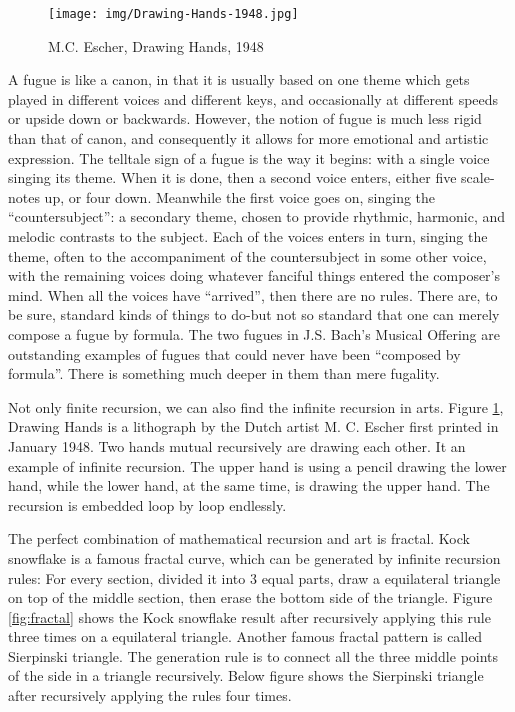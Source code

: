 \documentclass{article}
\begin{document}
\begin{figure}[htbp]
 \centering
 \texttt{[image: img/Drawing-Hands-1948.jpg]}
 \caption{M.C. Escher, Drawing Hands, 1948}
 \label{fig:Drawing-Hands}
\end{figure}

A fugue is like a canon, in that it is usually based on one theme which gets played in different voices and different keys, and occasionally at different speeds or upside down or backwards. However, the notion of fugue is much less rigid than that of canon, and consequently it allows for more emotional and artistic expression. The telltale sign of a fugue is the way it begins: with a single voice singing its theme. When it is done, then a second voice enters, either five scale-notes up, or four down. Meanwhile the first voice goes on, singing the ``countersubject'': a secondary theme, chosen to provide rhythmic, harmonic, and melodic contrasts to the subject. Each of the voices enters in turn, singing the theme, often to the accompaniment of the countersubject in some other voice, with the remaining voices doing whatever fanciful things entered the composer's mind. When all the voices have ``arrived'', then there are no rules. There are, to be sure, standard kinds of things to do-but not so standard that one can merely compose a fugue by formula. The two fugues in J.S. Bach's Musical Offering are outstanding examples of fugues that could never have been ``composed by formula''. There is something much deeper in them than mere fugality\cite{GEB}.

Not only finite recursion, we can also find the infinite recursion in arts. Figure \ref{fig:Drawing-Hands}, Drawing Hands is a lithograph by the Dutch artist M. C. Escher first printed in January 1948. Two hands mutual recursively are drawing each other. It an example of infinite recursion. The upper hand is using a pencil drawing the lower hand, while the lower hand, at the same time, is drawing the upper hand. The recursion is embedded loop by loop endlessly.

The perfect combination of mathematical recursion and art is fractal. Kock snowflake is a famous fractal curve, which can be generated by infinite recursion rules: For every section, divided it into 3 equal parts, draw a equilateral triangle on top of the middle section, then erase the bottom side of the triangle. Figure \ref{fig:fractal} shows the Kock snowflake result after recursively applying this rule three times on a equilateral triangle. Another famous fractal pattern is called Sierpinski triangle. The generation rule is to connect all the three middle points of the side in a triangle recursively. Below figure shows the Sierpinski triangle after recursively applying the rules four times.
\end{document}
